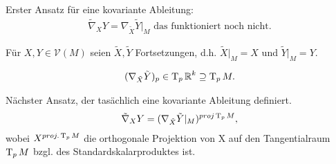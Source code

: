 \begin{bsp}
\begin{enumerate}[label=(\arabic*)]
Erster Ansatz für eine kovariante Ableitung:
  \begin{align*}
    \tilde \nabla_XY = \nabla_{\tilde X}\tilde Y|_M \text{ das funktioniert noch nicht.}
  \end{align*}

Für $X,Y \in \mathcal V(M)$ seien $\tilde X, \tilde Y$ Fortsetzungen, d.h. $\tilde X|_M = X$ und $\tilde Y|_M = Y$.

\begin{align*}
  (\nabla_{\tilde X}\tilde Y)_p \in \operatorname{T}_p\operatorname{\mathbb{R}}^k \supseteq \operatorname{T}_pM.
\end{align*}

Nächster Ansatz, der tasächlich eine kovariante Ableitung definiert.
\begin{align*}
  \tilde \nabla_XY = (\nabla_{\tilde X}\tilde Y|_M)^{proj\operatorname{T}_pM},
\end{align*}
wobei $X^{proj.\operatorname{T}_pM}$ die orthogonale Projektion von X auf den Tangentialraum $\operatorname{T}_pM$ bzgl. des Standardskalarproduktes ist.

  \end{enumerate}
\end{bsp}

